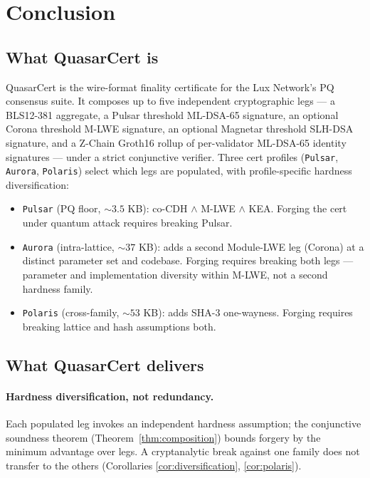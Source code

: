 \section{Conclusion}
\label{sec:conclusion}

\subsection{What QuasarCert is}

QuasarCert is the wire-format finality certificate for the Lux
Network's PQ consensus suite. It composes up to five independent
cryptographic legs --- a BLS12-381 aggregate, a Pulsar threshold
ML-DSA-65 signature, an optional Corona threshold M-LWE signature,
an optional Magnetar threshold SLH-DSA signature, and a Z-Chain
Groth16 rollup of per-validator ML-DSA-65 identity signatures ---
under a strict conjunctive verifier. Three cert profiles
(\texttt{Pulsar}, \texttt{Aurora}, \texttt{Polaris}) select which
legs are populated, with profile-specific hardness diversification:

\begin{itemize}[leftmargin=2em,nosep]
\item \texttt{Pulsar} (PQ floor, $\sim 3.5$ KB): co-CDH $\wedge$
      M-LWE $\wedge$ KEA. Forging the cert under quantum attack
      requires breaking Pulsar.
\item \texttt{Aurora} (intra-lattice, $\sim 37$ KB): adds a second
      Module-LWE leg (Corona) at a distinct parameter set and
      codebase. Forging requires breaking both legs --- parameter
      and implementation diversity within M-LWE, not a second
      hardness family.
\item \texttt{Polaris} (cross-family, $\sim 53$ KB): adds SHA-3
      one-wayness. Forging requires breaking lattice and hash
      assumptions both.
\end{itemize}

\subsection{What QuasarCert delivers}

\paragraph{Hardness diversification, not redundancy.} Each populated
leg invokes an independent hardness assumption; the conjunctive
soundness theorem (Theorem~\ref{thm:composition}) bounds forgery
by the minimum advantage over legs. A cryptanalytic break against
one family does not transfer to the others (Corollaries
\ref{cor:diversification}, \ref{cor:polaris}).

